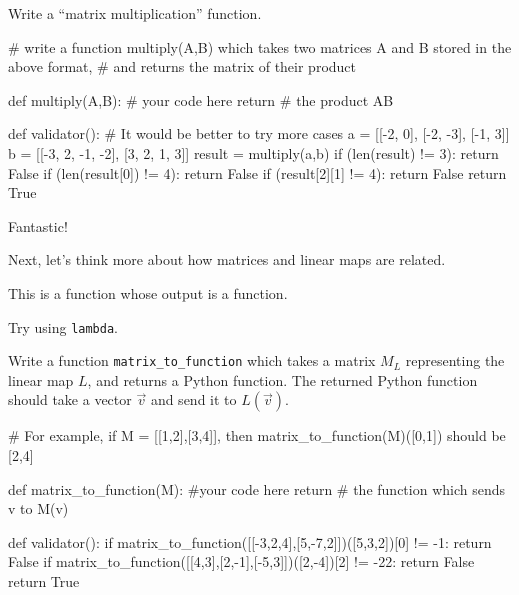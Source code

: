 \documentclass{ximera}
\begin{document}
\begin{exercise}
Write a ``matrix multiplication'' function.

\begin{solution}
\begin{python}
# write a function multiply(A,B) which takes two matrices A and B stored in the above format,
# and returns the matrix of their product
		
def multiply(A,B):
  # your code here
  return # the product AB

def validator():
  # It would be better to try more cases
  a = [[-2, 0], [-2, -3], [-1, 3]]
  b = [[-3, 2, -1, -2], [3, 2, 1, 3]]
  result = multiply(a,b)
  if (len(result) != 3):
    return False
  if (len(result[0]) != 4):
    return False
  if (result[2][1] != 4):
    return False
  return True
\end{python}
\end{solution}

Fantastic!

Next, let's think more about how matrices and linear maps are related.

\begin{solution}
  \begin{hint}
  \begin{warning}
    This is a function whose output is a function.
  \end{warning}
  \end{hint}

  \begin{hint}
    Try using \verb|lambda|.
  \end{hint}

  Write a function \verb|matrix_to_function| which takes a matrix
  $M_L$ representing the linear map $L$, and returns a Python
  function.  The returned Python function should take a vector
  $\vec{v}$ and send it to $L(\vec{v})$.

\begin{python}
# For example, if M = [[1,2],[3,4]], then matrix_to_function(M)([0,1]) should be [2,4]

def matrix_to_function(M):
  #your code here
  return # the function which sends v to M(v)

def validator():
  if matrix_to_function([[-3,2,4],[5,-7,2]])([5,3,2])[0] != -1:
    return False
  if matrix_to_function([[4,3],[2,-1],[-5,3]])([2,-4])[2] != -22:
    return False
  return True
\end{python}
\end{solution}


\end{exercise}
\end{document}
